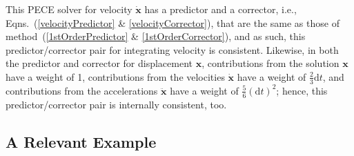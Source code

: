 This PECE solver for velocity $\dot{\mathbf{x}}$ has a predictor and a corrector, i.e., Eqns.~(\ref{velocityPredictor} \& \ref{velocityCorrector}), that are the same as those of method~(\ref{1stOrderPredictor} \& \ref{1stOrderCorrector}), and as such, this predictor\slash corrector pair for integrating velocity is consistent.  Likewise, in both the predictor and corrector for displacement $\mathbf{x}$, contributions from the solution $\mathbf{x}$ have a weight of 1, contributions from the velocities $\dot{\mathbf{x}}$ have a weight of $\tfrac{2}{3} \mathrm{d}t$, and contributions from the accelerations $\ddot{\mathbf{x}}$ have a weight of $\tfrac{5}{6} (\mathrm{d}t)^2$; hence, this predictor\slash corrector pair is internally consistent, too.

\subsection{A Relevant Example}
\label{sec:solve2ndOrderODE}

